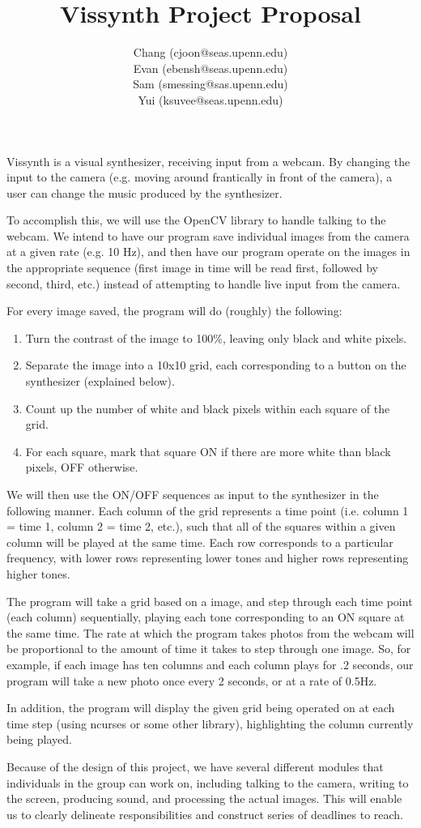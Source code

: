 \documentclass{article}
\title{Vissynth Project Proposal}
\author{Chang (cjoon@seas.upenn.edu) \\ Evan (ebensh@seas.upenn.edu) \\ Sam (smessing@sas.upenn.edu) \\ Yui (ksuvee@seas.upenn.edu)}
\begin{document}
\maketitle

Vissynth is a visual synthesizer, receiving input from a webcam.
By changing the input to the camera (e.g. moving around
frantically in front of the camera), a user can change the music
produced by the synthesizer.

To accomplish this, we will use the OpenCV library to handle
talking to the webcam. We intend to have our program save
individual images from the camera at a given rate (e.g. 10 Hz),
and then have our program operate on the images in the appropriate
sequence (first image in time will be read first, followed by
second, third, etc.) instead of attempting to handle live input
from the camera.

For every image saved, the program will do (roughly) the
following:

\begin{enumerate}
  \item Turn the contrast of the image to 100\%, leaving only black and white pixels.
  \item Separate the image into a 10x10 grid, each corresponding to a button on the synthesizer (explained below).
  \item Count up the number of white and black pixels within each square of the grid.
  \item For each square, mark that square ON if there are more white than black pixels, OFF otherwise.
\end{enumerate}

We will then use the ON/OFF sequences as input to the synthesizer
in the following manner. Each column of the grid represents a time
point (i.e. column 1 = time 1, column 2 = time 2, etc.), such that
all of the squares within a given column will be played at the
same time. Each row corresponds to a particular frequency, with
lower rows representing lower tones and higher rows representing
higher tones.

The program will take a grid based on a image, and step through
each time point (each column) sequentially, playing each tone
corresponding to an ON square at the same time. The rate at which
the program takes photos from the webcam will be proportional to
the amount of time it takes to step through one image. So, for
example, if each image has ten columns and each column plays for
.2 seconds, our program will take a new photo once every 2
seconds, or at a rate of 0.5Hz.

In addition, the program will display the given grid being
operated on at each time step (using ncurses or some other
library), highlighting the column currently being played.

Because of the design of this project, we have several different
modules that individuals in the group can work on, including
talking to the camera, writing to the screen, producing sound, and
processing the actual images. This will enable us to clearly
delineate responsibilities and construct series of deadlines to
reach.
\end{document}

